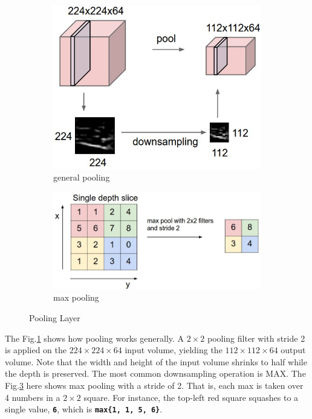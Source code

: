 \documentclass[twoside]{article}
\begin{document}
\begin{figure}[!htb]
\begin{subfigure}[!htb]{0.45\linewidth}
\includegraphics[scale=0.33]{pics/pool}
\caption{general pooling}
\label{fig:genpool}
\end{subfigure}
\hfill
\begin{subfigure}[!htb]{0.54\linewidth}
\includegraphics[scale=0.33]{pics/maxpool}
\caption{max pooling}
\label{fig:maxpool}
\end{subfigure}
\caption{Pooling Layer\cite{cs231n-website}}
\end{figure}

The Fig.\ref{fig:genpool} shows how pooling works generally. A $2\times2$ pooling filter with stride 2 is applied on the $224\times224\times64$ input volume, yielding the $112\times112\times64$ output volume. Note that the width and height of the input volume shrinks to half while the depth is preserved. The most common downsampling operation is MAX. The Fig.\ref{fig:maxpool} here shows max pooling with a stride of 2. That is, each max is taken over 4 numbers in a $2\times2$ square. For instance, the top-left red square squashes to a single value, \texttt{\textbf{6}}, which is \texttt{\textbf{max\{1, 1, 5, 6\}}}.
\end{document}
